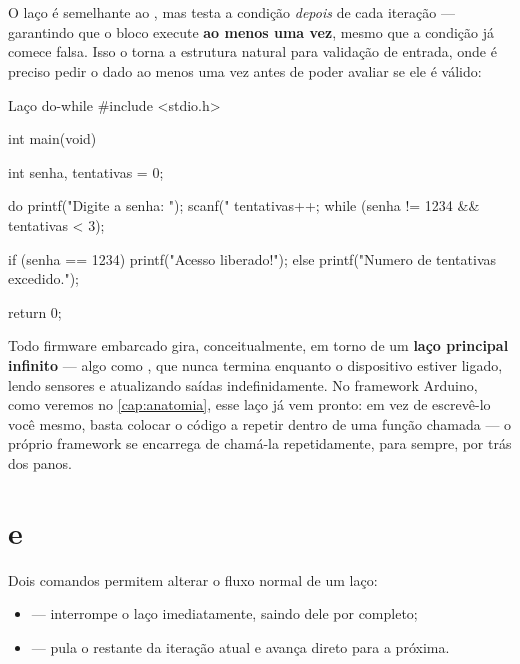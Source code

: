 \section{}

O laço  é semelhante ao , mas testa a condição \emph{depois} de cada iteração — garantindo que o bloco execute \textbf{ao menos uma vez}, mesmo que a condição já comece falsa. Isso o torna a estrutura natural para validação de entrada, onde é preciso pedir o dado ao menos uma vez antes de poder avaliar se ele é válido:

\begin{codigoc}{Laço do-while}
#include <stdio.h>

int main(void) {
    int senha, tentativas = 0;

    do {
        printf("Digite a senha: ");
        scanf("%
        tentativas++;
    } while (senha != 1234 && tentativas < 3);

    if (senha == 1234) {
        printf("Acesso liberado!\n");
    } else {
        printf("Numero de tentativas excedido.\n");
    }

    return 0;
}
\end{codigoc}

\begin{esp32box}
Todo firmware embarcado gira, conceitualmente, em torno de um \textbf{laço principal infinito} — algo como , que nunca termina enquanto o dispositivo estiver ligado, lendo sensores e atualizando saídas indefinidamente. No framework Arduino, como veremos no \cref{cap:anatomia}, esse laço já vem pronto: em vez de escrevê-lo você mesmo, basta colocar o código a repetir dentro de uma função chamada  — o próprio framework se encarrega de chamá-la repetidamente, para sempre, por trás dos panos.
\end{esp32box}

\section{ e }

Dois comandos permitem alterar o fluxo normal de um laço:

\begin{itemize}
    \item {} — interrompe o laço imediatamente, saindo dele por completo;
    \item {} — pula o restante da iteração atual e avança direto para a próxima.
\end{itemize}


